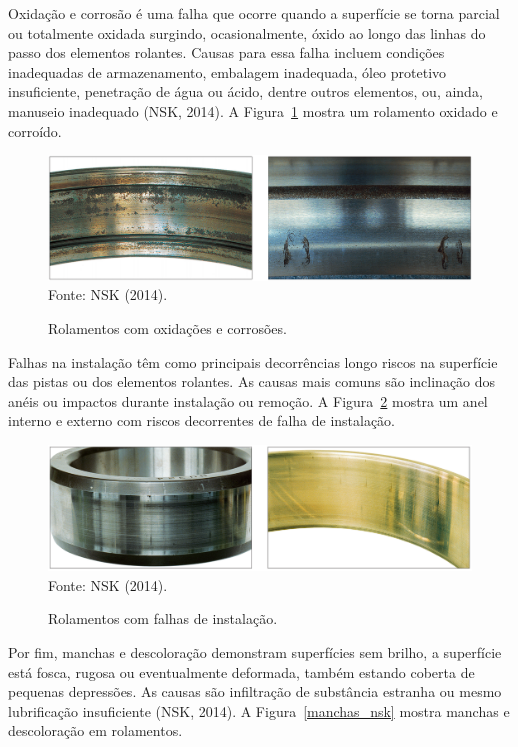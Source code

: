 \documentclass[
	12pt,				
	oneside,			
	a4paper,			
	english,			
	brazil,	
	sumario=abnt-6027-2012		
	]{abntex2ppgsi}
\begin{document}
Oxidação e corrosão é uma falha que ocorre quando a superfície se torna parcial ou totalmente oxidada surgindo, ocasionalmente, óxido ao longo das linhas do passo dos elementos rolantes. Causas para essa falha incluem condições inadequadas de armazenamento, embalagem inadequada, óleo protetivo insuficiente, penetração de água ou ácido, dentre outros elementos, ou, ainda, manuseio inadequado (NSK, 2014). A Figura~\ref{oxidacao_nsk} mostra um rolamento oxidado e corroído.

\begin{figure}[H]
\centering
\caption {Rolamentos com oxidações e corrosões.}
\includegraphics[width=\textwidth,height=\textheight,keepaspectratio]{oxidacao_nsk} \\
Fonte: NSK (2014).
\label{oxidacao_nsk}
\end{figure}

Falhas na instalação têm como principais decorrências longo riscos na superfície das pistas ou dos elementos rolantes. As causas mais comuns são inclinação dos anéis ou impactos durante instalação ou remoção. A Figura~\ref{falha_instalacao_nsk} mostra um anel interno e externo com riscos decorrentes de falha de instalação.

\begin{figure}[H]
\centering
\caption {Rolamentos com falhas de instalação.}
\includegraphics[width=\textwidth,height=\textheight,keepaspectratio]{falha_instalacao_nsk} \\
Fonte: NSK (2014).
\label{falha_instalacao_nsk}
\end{figure}

Por fim, manchas e descoloração demonstram superfícies sem brilho, a superfície está fosca, rugosa ou eventualmente deformada, também estando coberta de pequenas depressões. As causas são infiltração de substância estranha ou mesmo lubrificação insuficiente (NSK, 2014). A Figura~\ref{manchas_nsk} mostra manchas e descoloração em rolamentos.
\end{document}
